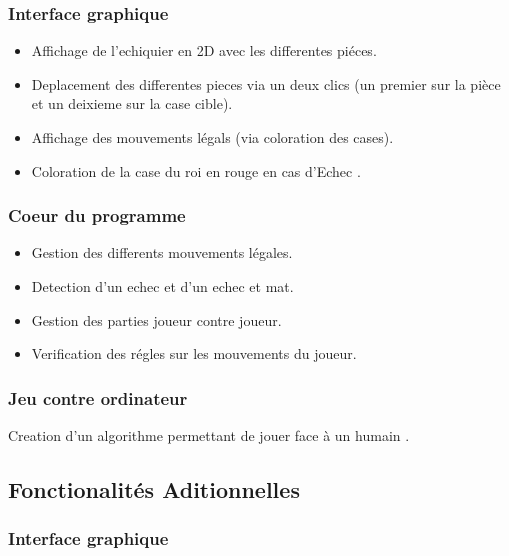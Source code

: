 \documentclass{article}
\begin{document}
\subsubsection{Interface graphique}

\begin{itemize}

\item Affichage de l'echiquier en 2D avec les differentes piéces.
\item Deplacement des differentes pieces via un deux clics (un premier sur la pièce et un deixieme sur la case cible).
\item Affichage des mouvements légals (via coloration des cases).
\item Coloration de la case du roi en rouge en cas d'Echec .

\end{itemize}

\subsubsection{Coeur du programme}

\begin{itemize}

\item Gestion des differents mouvements légales.
\item Detection d'un echec et d'un echec et mat.
\item Gestion des parties joueur contre joueur.
\item Verification des régles sur les mouvements du joueur.
\end{itemize}

\subsubsection{Jeu contre ordinateur}

Creation d'un algorithme permettant de jouer face à un humain .

\subsection{Fonctionalités Aditionnelles}

\subsubsection{Interface graphique}
\end{document}
